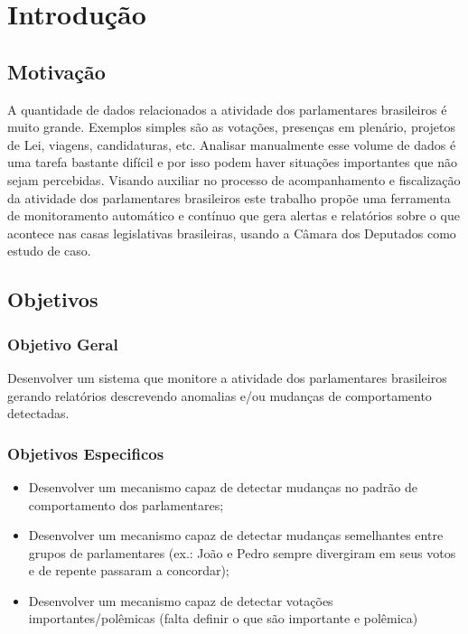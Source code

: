 \chapter{Introdução} \label{intro}

\section{Motivação}\label{sec:motiva}

A quantidade de dados relacionados a atividade dos parlamentares brasileiros é muito grande. Exemplos simples são as votações, presenças em plenário, projetos de Lei, viagens, candidaturas, etc. Analisar manualmente esse volume de dados é uma tarefa bastante difícil e por isso podem haver situações importantes que não sejam percebidas. Visando auxiliar no processo de acompanhamento e fiscalização da atividade dos parlamentares brasileiros este trabalho propõe uma ferramenta de monitoramento automático e contínuo que gera alertas e relatórios sobre o que acontece nas casas legislativas brasileiras, usando a Câmara dos Deputados como estudo de caso.

\section{Objetivos}

\subsection{Objetivo Geral}

Desenvolver um sistema que monitore a atividade dos parlamentares brasileiros gerando relatórios descrevendo anomalias e/ou mudanças de comportamento detectadas.

\subsection{Objetivos Especificos}

\begin{itemize}
\item Desenvolver um mecanismo capaz de detectar mudanças no padrão de comportamento dos parlamentares;
\item Desenvolver um mecanismo capaz de detectar mudanças semelhantes entre grupos de parlamentares (ex.: João e Pedro sempre divergiram em seus votos e de repente passaram a concordar);
\item Desenvolver um mecanismo capaz de detectar votações importantes/polêmicas (falta definir o que são importante e polêmica)
\end{itemize}

